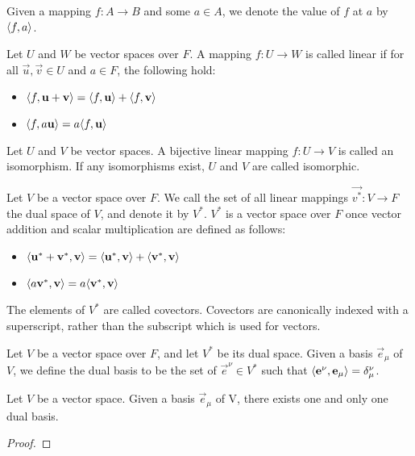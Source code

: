 \documentclass[../main.tex]{subfiles}
\begin{document}
    \begin{notation}[Mappings]
        Given a mapping \(f:A\to{}B\) and some \(a\in{}A\), we denote the value of \(f\) at \(a\) by \(\langle f,a\rangle\).
    \end{notation}
    \begin{definition}
        Let \(U\) and \(W\) be vector spaces over \(F\). A mapping \(f:U\to{}W\) is called linear if for all \(\vec{u},\vec{v}\in{}U\) and \(a\in{}F\), the following hold:
        \begin{itemize}
            \item\(\langle f,\mathbf{u}+\mathbf{v}\rangle=\langle f,\mathbf{u}\rangle+\langle f,\mathbf{v}\rangle\)
            \item\(\langle f,a\mathbf{u}\rangle=a\langle f,\mathbf{u}\rangle\)
        \end{itemize}
    \end{definition}
    \begin{definition}[Isomorphism]
        Let \(U\) and \(V\) be vector spaces. A bijective linear mapping \(f:U\to{}V\) is called an isomorphism. If any isomorphisms exist, \(U\) and \(V\) are called isomorphic.
    \end{definition}
    \begin{definition}
        Let \(V\) be a vector space over \(F\). We call the set of all linear mappings \(\vec{v^{*}}:V\to{}F\) the dual space of \(V\), and denote it by \(V^{*}\). \(V^{*}\) is a vector space over \(F\) once vector addition and scalar multiplication are defined as follows:
        \begin{itemize}
            \item\(\langle\mathbf{u}^{*}+\mathbf{v}^{*},\mathbf{v}\rangle=\langle\mathbf{u}^{*},\mathbf{v}\rangle+\langle\mathbf{v}^{*},\mathbf{v}\rangle\)
            \item\(\langle a\mathbf{v}^{*},\mathbf{v}\rangle=a\langle\mathbf{v}^{*},\mathbf{v}\rangle\)
        \end{itemize}
        The elements of \(V^{*}\) are called covectors. Covectors are canonically indexed with a superscript, rather than the subscript which is used for vectors.
    \end{definition}
    \begin{definition}
        Let \(V\) be a vector space over \(F\), and let \(V^{*}\) be its dual space. Given a basis \(\vec{e}_{\mu}\) of \(V\), we define the dual basis to be the set of \(\vec{e}^{\nu}\in{}V^{*}\) such that \(\langle\mathbf{e}^{\nu},\mathbf{e}_{\mu}\rangle=\delta^{\nu}_{\mu}\).
    \end{definition}
    \begin{theorem}
        Let \(V\) be a vector space. Given a basis \(\vec{e}_{\mu}\) of V, there exists one and only one dual basis.
        \begin{proof}
        \end{proof}
    \end{theorem}
\end{document}
